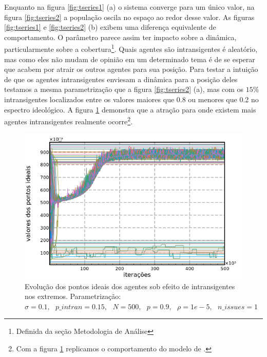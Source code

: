     Enquanto na figura \ref{fig:tseries1} (a) o sistema converge para um único
    valor, na figura \ref{fig:tseries2} a população oscila no espaço ao redor
    desse valor. As figuras \ref{fig:tseries1} e \ref{fig:tseries2} (b) exibem
    uma diferença equivalente de comportamento. O parâmetro parece assim ter
    impacto sobre a dinâmica, particularmente sobre a
    cobertura\footnote{Definida da seção Metodologia de Análise}. Quais agentes
    são intransigentes é aleatório, mas como eles não mudam de opinião em um
    determinado tema é de se esperar que acabem por atrair os outros agentes
    para sua posição. Para testar a intuição de que os agentes intransigentes
    enviesam a dinâmica para a posição deles testamos a mesma parametrização que
    a figura \ref{fig:tseries2} (a), mas com os \(15\%\) intransigentes
    localizados entre os valores maiores que 0.8 ou menores que 0.2 no espectro
    ideológico. A figura \ref{fig:tseries3} demonstra que a atração para onde
    existem mais agentes intransigentes realmente ocorre\footnote{Com a figura
      \ref{fig:tseries3} replicamos o comportamento do modelo de
      .}.

      \begin{figure}[H]
    \centering
    \includegraphics[scale=0.7]{ims/sigma01extremes.png}
    \caption{ Evolução dos pontos ideais dos agentes sob efeito de
      intransigentes nos extremos. Parametrização: \( \sigma = 0.1, \text{ }
      p\_intran = 0.15, \text{ } N = 500, \text{ } p = 0.9, \text{ } \rho = 1e-5,
      \text{ } n\_issues = 1 \)}
    \label{fig:tseries3}
  \end{figure}

